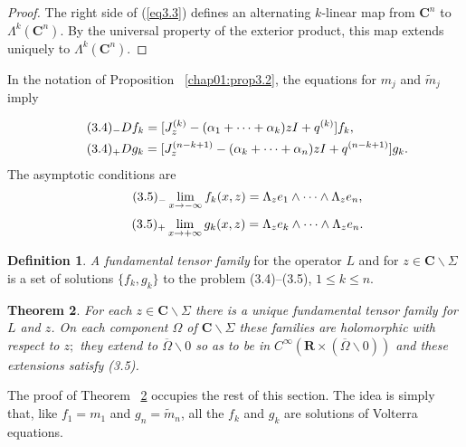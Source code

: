 \documentclass{surv-l}
\theoremstyle{plain}
\newtheorem{theorem}{Theorem}[section]
\theoremstyle{definition}
\newtheorem{definition}[theorem]{Definition}
\numberwithin{equation}{chapter}
\begin{document}
\begin{proof} The right side of (\ref{eq3.3}) defines an alternating $k$-linear map from $\mathbf{C}^{n}$ to $\Lambda^{k}(\mathbf{C}^{n})$. By the universal property of the exterior product, this map extends uniquely to $\Lambda^{k}(\mathbf{C}^{n})$.
\end{proof}

In the notation of Proposition ~\ref{chap01:prop3.2}, the equations for $m_{j}$ and $\tilde{m}_{j}$ imply

\begin{align*}
&\tag*{$(3.4)_{-}$}  Df_{k}=[J_{z}^{(k)}-(\alpha_{1}+\cdots +\alpha_{k})zI+q^{(k)}]f_{k},\\ 
&\tag*{$(3.4)_{+}$}  Dg_{k}=[J_{z}^{(n-k+1)}-(\alpha_{k}+\cdots +\alpha_{n})zI+q^{(n-k+1)}]g_{k}.
\end{align*}
The asymptotic conditions are
\begin{equation*}
\tag*{$(3.5)_{-}$} \displaystyle \lim_{x\rightarrow-\infty} f_{k}(x, z)=\Lambda_{z}e_{1}\wedge\cdots\wedge\Lambda_{z}e_{n},
\end{equation*}
\begin{equation*}\label{eq3.35+}
\tag*{$(3.5)_{+}$}\displaystyle \lim_{x\rightarrow+\infty}  g_{k}(x,z)=\Lambda_{z}e_{k}\wedge \cdots\wedge\Lambda_{z}e_{n}.
\end{equation*}
\setcounter{theorem}{5}
\setcounter{equation}{7}
\begin{definition}\label{chap01:defi3.6}
\emph{A fundamental tensor family} for the operator $L$ and for $
z\in \mathbf{C}\backslash \Sigma$ is a set of solutions $\{f_{k},
g_{k}\}$ to the problem (3.4)--(3.5), $1\leq k\leq n$.
\end{definition}

\begin{theorem}\label{chap01:thm3.7}
For each $ z\in \mathbf{C}\backslash \Sigma$ there is a unique fundamental tensor family for $L$ and $z$. On each component $\Omega$ of $ \mathbf{C}\backslash \Sigma$ these families are holomorphic with respect to $z;$ they extend to $\overline{\Omega}\backslash 0$ so as to be in $C^{\infty}(\mathbf{R}\times(\overline{\Omega}\backslash 0))$ and these extensions satisfy \emph{(3.5)}.
\end{theorem}

The proof of Theorem ~\ref{chap01:thm3.7} occupies the rest of this section. The idea is simply that, like $f_{1}=m_{1}$ and $g_{n}=\tilde{m}_{n}$, all the $f_{k}$ and $g_{k}$ are solutions of Volterra equations.
\end{document}
